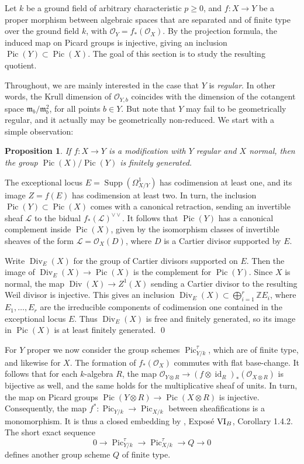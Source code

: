 \documentclass[oneside, 12pt]{amsart}
\newcommand\mylabel[1]{\label{#1}\marginpar{\vspace{-1ex}\medskip\medskip\footnotesize \tt #1}}
\renewcommand\mylabel[1]{\label{#1}}
\newtheorem{proposition}[theorem]{Proposition}
\theoremstyle{definition}
\theoremstyle{remark}
\newcommand{\ZZ}{\mathbb{Z}}
\newcommand{\shL}{\mathscr{L}}
\newcommand{\Div}{\operatorname{Div}}
\newcommand{\id}{{\operatorname{id}}}
\newcommand{\lra}{\longrightarrow}
\newcommand{\maxid}{\mathfrak{m}}
\renewcommand{\O}{\mathscr{O}}
\newcommand{\Pic}{\operatorname{Pic}}
\newcommand{\ra}{\rightarrow}
\newcommand{\Supp}{\operatorname{Supp}}
\begin{document}
Let $k$ be a ground field of arbitrary characteristic $p\geq 0$, 
and $f:X\ra Y$ be a proper morphism between algebraic spaces that are separated and of finite type over the ground field $k$,
with $\O_Y=f_*(\O_X)$. 
By the projection formula, the induced map on Picard groups is injective, giving an inclusion $\Pic(Y)\subset \Pic(X)$.
The goal of this section is to study the resulting quotient.

Throughout, we are mainly interested in the case that $Y$ is     \emph{regular}. In other words,  the Krull dimension
of $\O_{Y,b}$ coincides with the dimension of the cotangent space  $\maxid_b/\maxid_b^2$, for all points $b\in Y$.
But note that $Y$ may fail to be geometrically regular, and it   actually may be geometrically non-reduced.
We start with a simple observation:
 
\begin{proposition}
\mylabel{quotient finitely generated}
If $f:X\ra Y$ is a modification with $Y$ regular and $X$ normal, then the group $\Pic(X)/\Pic(Y)$ is finitely generated.
\end{proposition}

\proof 
The exceptional locus $E=\Supp(\Omega^1_{X/Y})$ has codimension at least one, and its image $Z=f(E)$ has codimension at least two.
In turn, the inclusion $\Pic(Y)\subset\Pic(X)$ comes with a canonical retraction, sending an invertible sheaf $\shL$
to the bidual $f_*(\shL)^{\vee\vee}$. It follows that $\Pic(Y)$ has a canonical complement inside $\Pic(X)$,
given by the isomorphism classes of invertible sheaves of the form $\shL=\O_X(D)$,
where $D$ is a Cartier divisor supported by $E$. 

Write $\Div_E(X)$ for the group of      Cartier divisors supported on $E$. Then the image of  $\Div_E(X)\ra \Pic(X)$
is the   complement for $\Pic(Y)$.
Since $X$ is normal, the map $\Div(X)\ra Z^1(X)$ sending a Cartier divisor to the resulting Weil divisor is injective.
This gives an inclusion $\Div_E(X)\subset \bigoplus_{i=1}^r\ZZ E_i$, where $E_1,\ldots,E_r$ are the
irreducible components of codimension one contained in the exceptional locus $E$. Thus $\Div_E(X)$ is free and finitely generated, so
its image in $\Pic(X)$ is at least finitely generated.
\qed

\medskip
For $Y$ proper we now consider the group schemes $\Pic^\tau_{Y/k}$, which are of finite type, and likewise for $X$.
The formation of   $f_*(\O_X)$ commutes with flat base-change.
It follows that for each  $k$-algebra $R$, the map $\O_{Y\otimes R}\ra (f\otimes\id_R)_*(\O_{X\otimes R})$
is bijective as well, and the same holds for the multiplicative sheaf of units.
In turn, the map on Picard groups $\Pic(Y\otimes R)\ra \Pic(X\otimes R)$ 
is injective. Consequently, the map   $f^*:\Pic_{Y/k}\ra\Pic_{X/k}$ between sheafifications is a monomorphism.
It is thus a closed embedding by \cite{SGA 3a}, Expos\'e $\text{\rm VI}_B$, Corollary 1.4.2.
The short exact sequence 
$$
0\lra \Pic^\tau_{Y/k}\lra  \Pic^\tau_{X/k} \lra Q\lra 0
$$
defines another group scheme $Q$ of finite type.
\end{document}

